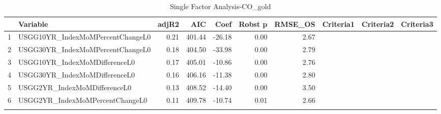 \begin{longtable}{rlrrrrrlll}
  \hline
 & Variable & adjR2 & AIC & Coef & Robst p & RMSE\_OS & Criteria1 & Criteria2 & Criteria3 \\ 
  \hline
1 & USGG10YR\_IndexMoMPercentChangeL0 & 0.21 & 401.44 & -26.18 & 0.00 & 2.67 &  &  &  \\ 
  2 & USGG30YR\_IndexMoMPercentChangeL0 & 0.18 & 404.50 & -33.98 & 0.00 & 2.79 &  &  &  \\ 
  3 & USGG10YR\_IndexMoMDifferenceL0 & 0.17 & 405.01 & -10.86 & 0.00 & 2.76 &  &  &  \\ 
  4 & USGG30YR\_IndexMoMDifferenceL0 & 0.16 & 406.16 & -11.38 & 0.00 & 2.80 &  &  &  \\ 
  5 & USGG2YR\_IndexMoMDifferenceL0 & 0.13 & 408.52 & -14.40 & 0.00 & 3.50 &  &  &  \\ 
  6 & USGG2YR\_IndexMoMPercentChangeL0 & 0.11 & 409.78 & -10.74 & 0.01 & 2.66 &  &  &  \\ 
   \hline
\hline
\caption{Single Factor Analysis-CO_gold} 
\end{longtable}
